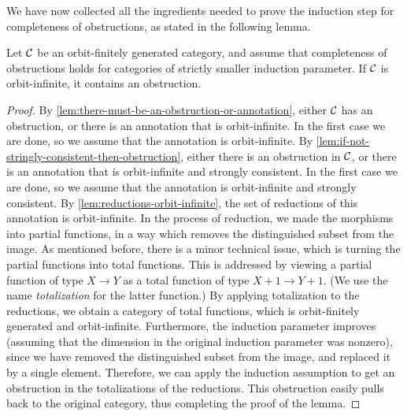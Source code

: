 We have now collected all the ingredients needed to prove the induction step for  completeness of obstructions, as stated in the following lemma.
\begin{lemma}\label{lem:completeness-of-obstructions-induction-step}
    Let ${\mathcal C}$ be an orbit-finitely generated category, and assume that completeness of obstructions holds for categories of strictly smaller induction parameter. If ${\mathcal C}$ is orbit-infinite, it contains an obstruction.
\end{lemma}
\begin{proof}
    By \cref{lem:there-must-be-an-obstruction-or-annotation}, either ${\mathcal C}$ has an obstruction, or there is an annotation that is orbit-infinite. In the first case we are done, so we assume that the annotation is orbit-infinite.  By \cref{lem:if-not-stringly-consistent-then-obstruction}, either there is an obstruction in ${\mathcal C}$, or there is an annotation that is orbit-infinite and strongly consistent. In the first case we are done, so we assume that the annotation is orbit-infinite and strongly consistent. By \cref{lem:reductions-orbit-infinite}, the set of reductions of this annotation is orbit-infinite. In the process of reduction, we made the morphisms into partial functions, in a way which removes the distinguished subset from the image. As mentioned before, there is a minor technical issue, which is turning the partial functions into total functions. This is addressed by viewing a partial function 
of type $X \to Y$ as a total function of type $X+1 \to Y+1$. (We use the name \emph{totalization} for the latter function.) By applying totalization to the reductions, we obtain a category of total functions, which is orbit-finitely generated and orbit-infinite. Furthermore, the induction parameter improves (assuming that the dimension in the original induction parameter was nonzero), since we have removed the distinguished subset from the image, and replaced it by a single element. Therefore, we can apply the induction assumption to get an obstruction in the totalizations of the reductions. This obstruction easily pulls back to the original category, thus completing the proof of the lemma.
\end{proof}





